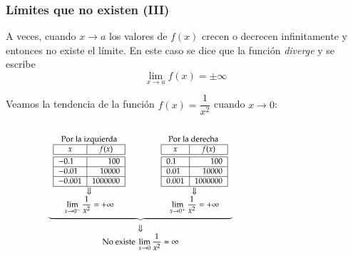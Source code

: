 \begin{frame}
	\frametitle{Límites que no existen (III)}
	A veces, cuando $x\rightarrow a$ los valores de $f(x)$ crecen o decrecen infinitamente y entonces no existe el límite. En este caso se dice que la función \emph{diverge} y se escribe
	\[\lim_{x\rightarrow a}f(x)=\pm \infty\]
	
	 Veamos la tendencia de la función $f(x)=\dfrac{1}{x^2}$ cuando $x\rightarrow 0$:
	\begin{columns}
		\begin{column}{0.6\textwidth}
			\[
				\footnotesize
				\begin{array}{c}
					\underbrace{\begin{array}{ccc}
					\textrm{Por la izquierda} & \qquad & \textrm{Por la derecha } \\
					\begin{array}{|l|r|}
					\hline
					\multicolumn{1}{|c|}{x}      & \multicolumn{1}{c|}{f(x)}   \\
					\hline\hline
					-0.1   & 100       \\
					\hline
					-0.01   & 10000     \\
					\hline
					-0.001  & 1000000   \\
					\hline
				\end{array}
				& &
				\begin{array}{|l|r|}
					\hline
					\multicolumn{1}{|c|}{x} & \multicolumn{1}{c|}{f(x)} \\
					\hline\hline
					0.1                     & 100                       \\
					\hline
					0.01                    & 10000                     \\
					\hline
					0.001                   & 1000000                   \\
					\hline
				\end{array}\\
				\Downarrow & & \Downarrow\\
				\displaystyle \lim_{x\rightarrow 0^-}\frac{1}{x^2}=+\infty
				& &
				\displaystyle \lim_{x\rightarrow 0^+}\frac{1}{x^2}=+\infty
				\end{array}}\\
				\Downarrow\\
				\displaystyle \textrm{No existe }\lim_{x\rightarrow 0}\frac{1}{x^2}=\infty
				\end{array}
			\]
		\end{column}
		\begin{column}{0.4\textwidth}
			\begin{center}
				\scalebox{1}{}
			\end{center}
		\end{column}
	\end{columns}
\end{frame}


